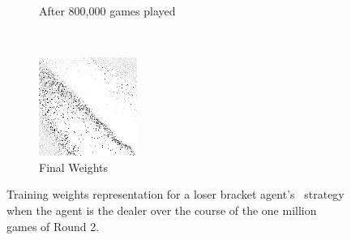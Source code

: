 \begin{figure}
\begin{subfigure}[t]{0.3\textwidth}
	\caption{After 800,000 games played}
	\end{subfigure}
	~
	\begin{subfigure}[t]{0.3\textwidth}
	\includegraphics[width=\textwidth]{images/findings/round2/flipbook/loser/checkpoint_999999.png}
	\caption{Final Weights}
	\end{subfigure}

\caption{
	Training weights representation for a loser bracket agent's \handmaxavg\
	strategy when the agent is the dealer
	over the course of the one million games of Round 2.
}
\label{fig:r2-flip-loser}
\end{figure}
